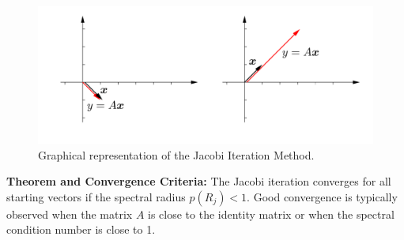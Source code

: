 \documentclass[unicode,11pt,a4paper,oneside,numbers=endperiod,openany]{scrartcl}
\begin{document}
\begin{figure}[H]
    \centering
    \includegraphics[trim=0cm 0cm 0cm 0cm, clip, width=15cm]{img10.png}
    \caption{Graphical representation of the Jacobi Iteration Method.}
    \label{fig:img10}
\end{figure}

\textbf{Theorem and Convergence Criteria:}
The Jacobi iteration converges for all starting vectors if the spectral radius \( p(R_j) < 1 \). Good convergence is typically observed when the matrix \( A \) is close to the identity matrix or when the spectral condition number is close to 1.

%
%
%
%
\end{document}

